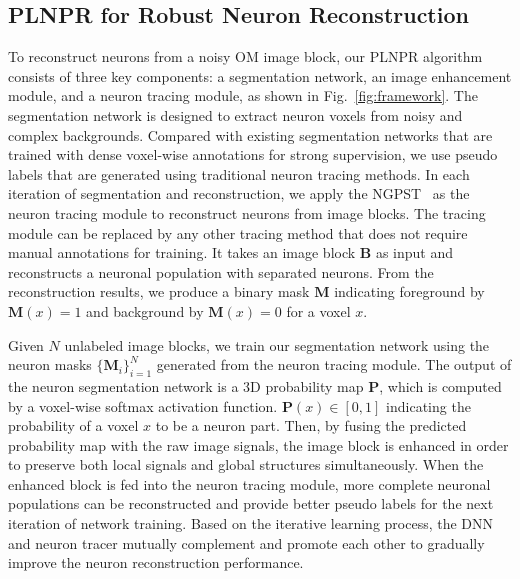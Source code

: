 \subsection{PLNPR for Robust Neuron Reconstruction}
\label{sec:PLNPR}

To reconstruct neurons from a noisy OM image block, our PLNPR algorithm consists of three key components: a segmentation network, an image enhancement module, and a neuron tracing module, as shown in Fig.~\ref{fig:framework}. 
%
The segmentation network is designed to extract neuron voxels from noisy and complex backgrounds.
Compared with existing segmentation networks that are trained with dense voxel-wise annotations for strong supervision, we use pseudo labels that are generated using traditional neuron tracing methods.
%
In each iteration of segmentation and reconstruction, we apply the NGPST~\cite{Quan2015} as the neuron tracing module to reconstruct neurons from image blocks. 
The tracing module can be replaced by any other tracing method that does not require manual annotations for training.
%
It takes an image block $\mathbf{B}$ as input and reconstructs a neuronal population with separated neurons.
From the reconstruction results, we produce a binary mask $\mathbf{M}$ indicating foreground by $\mathbf{M}(x)=1$ and background by $\mathbf{M}(x)=0$ for a voxel $x$.


Given $N$ unlabeled image blocks, we train our segmentation network using the neuron masks $\{\mathbf{M}_i\}_{i=1}^{N}$ generated from the neuron tracing module.
%
The output of the neuron segmentation network is a 3D probability map $\mathbf{P}$, which is computed by a voxel-wise softmax activation function. $\mathbf{P}(x)\in [0,1]$ indicating the probability of a voxel $x$ to be a neuron part.
%
Then, by fusing the predicted probability map with the raw image signals, the image block is enhanced in order to preserve both local signals and global structures simultaneously.
When the enhanced block is fed into the neuron tracing module, more complete neuronal populations can be reconstructed and provide better pseudo labels for the next iteration of network training. 
%
Based on the iterative learning process, the DNN and neuron tracer mutually complement and promote each other to gradually improve the neuron reconstruction performance.



